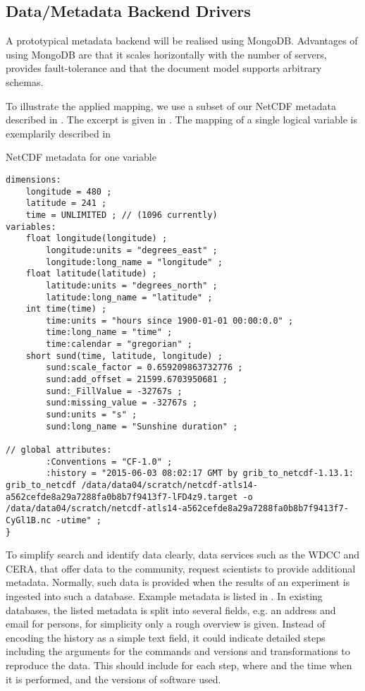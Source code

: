 \subsection{Data/Metadata Backend Drivers}
A prototypical metadata backend will be realised using MongoDB.
Advantages of using MongoDB are that it scales horizontally with the number of servers, provides fault-tolerance and that the document model supports arbitrary schemas.



To illustrate the applied mapping, we use a subset of our NetCDF metadata described in .
The excerpt is given in .
The mapping of a single logical variable is exemplarily described in


\begin{tcbcode}[label={lst:NetCDF-data-map}]{NetCDF metadata for one variable}
\begin{lstlisting}
dimensions:
	longitude = 480 ;
	latitude = 241 ;
	time = UNLIMITED ; // (1096 currently)
variables:
	float longitude(longitude) ;
		longitude:units = "degrees_east" ;
		longitude:long_name = "longitude" ;
	float latitude(latitude) ;
		latitude:units = "degrees_north" ;
		latitude:long_name = "latitude" ;
	int time(time) ;
		time:units = "hours since 1900-01-01 00:00:0.0" ;
		time:long_name = "time" ;
		time:calendar = "gregorian" ;
	short sund(time, latitude, longitude) ;
		sund:scale_factor = 0.659209863732776 ;
		sund:add_offset = 21599.6703950681 ;
		sund:_FillValue = -32767s ;
		sund:missing_value = -32767s ;
		sund:units = "s" ;
		sund:long_name = "Sunshine duration" ;

// global attributes:
		:Conventions = "CF-1.0" ;
		:history = "2015-06-03 08:02:17 GMT by grib_to_netcdf-1.13.1: grib_to_netcdf /data/data04/scratch/netcdf-atls14-a562cefde8a29a7288fa0b8b7f9413f7-lFD4z9.target -o /data/data04/scratch/netcdf-atls14-a562cefde8a29a7288fa0b8b7f9413f7-CyGl1B.nc -utime" ;
}
\end{lstlisting}
\end{tcbcode}

To simplify search and identify data clearly, data services such as the WDCC and CERA, that offer data to the community, request scientists to provide additional metadata.
Normally, such data is provided when the results of an experiment is ingested into such a database.
Example metadata is listed in .
In existing databases, the listed metadata is split into several fields, e.g. an address and email for persons, for simplicity only a rough overview is given.
Instead of encoding the history as a simple text field, it could
indicate detailed steps including the arguments for the commands and versions and transformations to reproduce the data.
This should include for each step, where and the time when it is performed, and the versions of software used.


